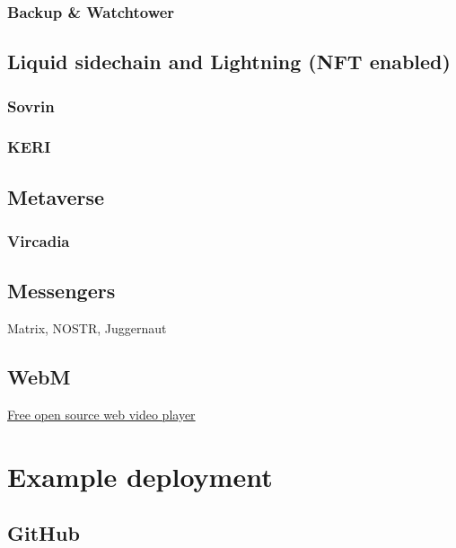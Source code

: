 \lipsum[50]
\subsection{Backup \& Watchtower}
\lipsum[50]
\section{Liquid sidechain and Lightning (NFT enabled)}
\lipsum[50]





\lipsum[50]
\subsection{Sovrin}
\lipsum[50]
\subsection{KERI}
\lipsum[50]
\section{Metaverse}
\lipsum[50]
\subsection{Vircadia}
\lipsum[50]
\section{Messengers}
Matrix, NOSTR, Juggernaut
\section{WebM}
\href{https://www.webmproject.org/about/}{Free open source web video player}
	
\lipsum[50]
\chapter{Example deployment }
\lipsum[50]
\section{GitHub }
\lipsum[50]